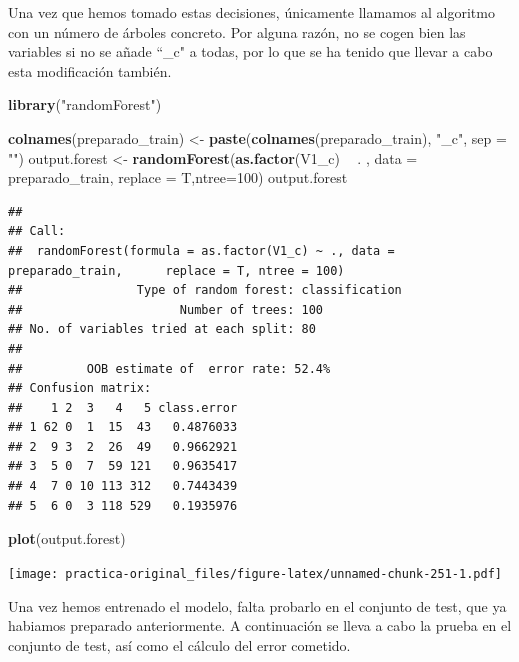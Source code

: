 \documentclass[spanish,]{article}
\newenvironment{Shaded}{\begin{snugshade}}{\end{snugshade}}
\newcommand{\KeywordTok}[1]{\textcolor[rgb]{0.13,0.29,0.53}{\textbf{#1}}}
\newcommand{\DataTypeTok}[1]{\textcolor[rgb]{0.13,0.29,0.53}{#1}}
\newcommand{\DecValTok}[1]{\textcolor[rgb]{0.00,0.00,0.81}{#1}}
\newcommand{\StringTok}[1]{\textcolor[rgb]{0.31,0.60,0.02}{#1}}
\newcommand{\OperatorTok}[1]{\textcolor[rgb]{0.81,0.36,0.00}{\textbf{#1}}}
\newcommand{\NormalTok}[1]{#1}
\begin{document}
Una vez que hemos tomado estas decisiones, únicamente llamamos al
algoritmo con un número de árboles concreto. Por alguna razón, no se
cogen bien las variables si no se añade ``\_c" a todas, por lo que se ha
tenido que llevar a cabo esta modificación también.

\begin{Shaded}
\begin{Highlighting}[]
\KeywordTok{library}\NormalTok{(}\StringTok{"randomForest"}\NormalTok{)}

\KeywordTok{colnames}\NormalTok{(preparado_train) <-}\StringTok{ }\KeywordTok{paste}\NormalTok{(}\KeywordTok{colnames}\NormalTok{(preparado_train), }\StringTok{"_c"}\NormalTok{, }\DataTypeTok{sep =} \StringTok{""}\NormalTok{)}
\NormalTok{output.forest <-}\StringTok{ }\KeywordTok{randomForest}\NormalTok{(}\KeywordTok{as.factor}\NormalTok{(V1_c) }\OperatorTok{~}\StringTok{ }\NormalTok{. , }\DataTypeTok{data =}\NormalTok{ preparado_train, }\DataTypeTok{replace =}\NormalTok{ T,}\DataTypeTok{ntree=}\DecValTok{100}\NormalTok{)}
\NormalTok{output.forest}
\end{Highlighting}
\end{Shaded}

\begin{verbatim}
## 
## Call:
##  randomForest(formula = as.factor(V1_c) ~ ., data = preparado_train,      replace = T, ntree = 100) 
##                Type of random forest: classification
##                      Number of trees: 100
## No. of variables tried at each split: 80
## 
##         OOB estimate of  error rate: 52.4%
## Confusion matrix:
##    1 2  3   4   5 class.error
## 1 62 0  1  15  43   0.4876033
## 2  9 3  2  26  49   0.9662921
## 3  5 0  7  59 121   0.9635417
## 4  7 0 10 113 312   0.7443439
## 5  6 0  3 118 529   0.1935976
\end{verbatim}

\begin{Shaded}
\begin{Highlighting}[]
\KeywordTok{plot}\NormalTok{(output.forest)}
\end{Highlighting}
\end{Shaded}

\texttt{[image: practica-original\_files/figure-latex/unnamed-chunk-251-1.pdf]}

Una vez hemos entrenado el modelo, falta probarlo en el conjunto de
test, que ya habiamos preparado anteriormente. A continuación se lleva a
cabo la prueba en el conjunto de test, así como el cálculo del error
cometido.
\end{document}
